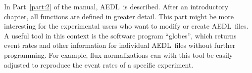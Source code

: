 \documentclass[a4paper,12pt,twoside]{book}
\newcommand{\Part}{Part}
\newcommand{\AEDL}{{\sf AEDL}}
\begin{document}
In \Part~\ref{part:2} of the manual, \AEDL\ is described. After an
introductory chapter, all functions are defined in greater detail.
This part might be more interesting for the experimental users who
want to modify or create \AEDL\ files. A useful tool in this context
is the software program ``globes'', which returns event rates and other
information for individual \AEDL\ files without further programming. 
For example, flux normalizations can with this tool be easily adjusted 
to reproduce the event rates of a specific experiment.









% 









\printindex
\end{document}
